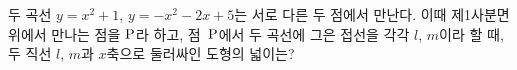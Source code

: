 두 곡선 $y=x^2+1$, $y=-x^2-2x+5$는 서로 다른 두 점에서 만난다. 이때 제1사분면 위에서 만나는 점을 $\mathrm{P}$라 하고, 점~$\mathrm{P}$에서 두 곡선에 그은 접선을 각각 $l$, $m$이라 할 때, 두 직선 $l$, $m$과 $x$축으로 둘러싸인 도형의 넓이는?
